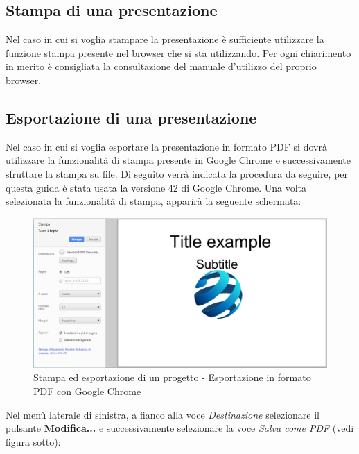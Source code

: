 \subsection{Stampa di una presentazione}
\noindent Nel caso in cui si voglia stampare la presentazione è sufficiente utilizzare la funzione stampa presente nel browser che si sta utilizzando. Per ogni chiarimento in merito è consigliata la consultazione del manuale d'utilizzo del proprio browser. 

\subsection{Esportazione di una presentazione}
Nel caso in cui si voglia esportare la presentazione in formato PDF si dovrà utilizzare la funzionalità di stampa presente in Google Chrome e successivamente sfruttare la stampa su file. Di seguito verrà indicata la procedura da seguire, per questa guida è stata usata la versione 42 di Google Chrome. Una volta selezionata la funzionalità di stampa, apparirà la seguente schermata:

\begin{figure}[H] 
	\centering 
	\includegraphics[scale=0.40] {img/print_google.png}
	\caption{Stampa ed esportazione di un progetto - Esportazione in formato PDF con Google Chrome} 
\end{figure}

\noindent Nel menù laterale di sinistra, a fianco alla voce \textit{Destinazione} selezionare il pulsante \textbf{Modifica...} e successivamente selezionare la voce \textit{Salva come PDF} (vedi figura sotto): 


